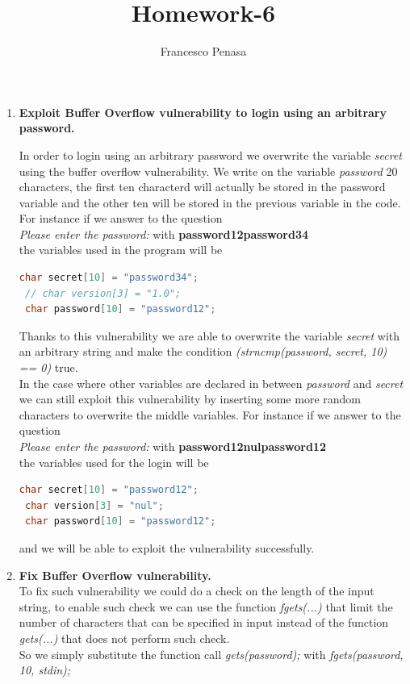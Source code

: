 \documentclass[11pt]{article}
\begin{document}
\author{Francesco Penasa}
\title{Homework-6}
\maketitle

\medskip

\begin{enumerate}

\item
\textbf{Exploit Buffer Overflow vulnerability to login using an arbitrary password.}

In order to login using an arbitrary password we overwrite the variable \textit{secret} using the buffer overflow vulnerability.
We write on the variable \textit{password} 20 characters, the first ten characterd will actually be stored in the password variable and the other ten will be stored in the previous variable in the code. For instance if we answer to the question \\ 
\textit{Please enter the password:} with \textbf{password12password34} \\
the variables used in the program will be
\begin{lstlisting}[language=C]
 char secret[10] = "password34";
 // char version[3] = "1.0";
 char password[10] = "password12";
\end{lstlisting}
Thanks to this vulnerability we are able to overwrite the variable \textit{secret} with an arbitrary string and make the condition \textit{(strncmp(password, secret, 10) == 0)} true. \\
In the case where other variables are declared in between \textit{password} and \textit{secret} we can still exploit this vulnerability by inserting some more random characters to overwrite the middle variables.
For instance if we answer to the question \\ 
\textit{Please enter the password:} with \textbf{password12nulpassword12} \\
the variables used for the login will be
\begin{lstlisting}[language=C]
 char secret[10] = "password12";
 char version[3] = "nul";
 char password[10] = "password12";
\end{lstlisting}
and we will be able to exploit the vulnerability successfully.

\item
\textbf{Fix Buffer Overflow vulnerability.} \\
To fix such vulnerability we could do a check on the length of the input string, to enable such check we can use the function \textit{fgets(...)} that limit the number of characters that can be specified in input instead of the function \textit{gets(...)} that does not perform such check. \\
So we simply substitute the function call \textit{gets(password);} with  \textit{fgets(password, 10, stdin);}\\


\end{enumerate}
\end{document}
